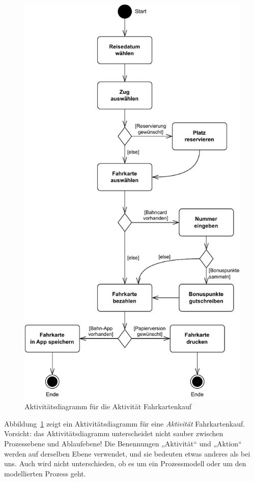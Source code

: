 \begin{figure}
	\centering
	\includegraphics[scale=0.7]{Bilder/Kapitel-5/aktivitaetsdiagramm_fahrkarte_kaufen.pdf}
	\caption{Aktivitätsdiagramm für die Aktivität Fahrkartenkauf}
	\label{fig:aktivitaetsdiagramm_fahrkarte_kaufen}
\end{figure}

Abbildung~\ref{fig:aktivitaetsdiagramm_fahrkarte_kaufen} zeigt ein Aktivitätsdiagramm für eine \textit{Aktivität} Fahrkartenkauf. Vorsicht: das Aktivitätsdiagramm unterscheidet nicht sauber zwischen Prozessebene und Ablaufebene! Die Benennungen „Aktivität“ und „Aktion“ werden auf derselben Ebene verwendet, und sie bedeuten etwas anderes als bei uns. Auch wird nicht unterschieden, ob es um ein Prozessmodell oder um den modellierten Prozess geht. 

